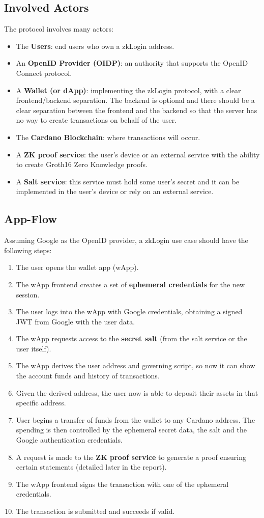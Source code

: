 \documentclass{article}
\begin{document}
\subsection{Involved Actors}
The protocol involves many actors:
\begin{itemize}
    \item The \textbf{Users}: end users who own a zkLogin address.
    \item An \textbf{OpenID Provider (OIDP)}: an authority that supports the OpenID Connect protocol.
    \item A \textbf{Wallet (or dApp)}: implementing the zkLogin protocol, with a clear frontend/backend separation. The backend is optional and there should be a clear separation between the frontend and the backend so that the server has no way to create transactions on behalf of the user.
    \item The \textbf{Cardano Blockchain}: where transactions will occur.
    \item A \textbf{ZK proof service}: the user's device or an external service with the ability to create Groth16 Zero Knowledge proofs.
    \item A \textbf{Salt service}: this service must hold some user's secret and it can be implemented in the user's device or rely on an external service.
\end{itemize}

\subsection{App-Flow}
Assuming Google as the OpenID provider, a zkLogin use case should have the following steps:
\begin{enumerate}
    \item The user opens the wallet app (wApp).
    \item The wApp frontend creates a set of \textbf{ephemeral credentials} for the new session.
    \item The user logs into the wApp with Google credentials, obtaining a signed JWT from Google with the user data.
    \item The wApp requests access to the \textbf{secret salt} (from the salt service or the user itself).
    \item The wApp derives the user address and governing script, so now it can show the account funds and history of transactions.
    \item Given the derived address, the user now is able to deposit their assets in that specific address.
    \item User begins a transfer of funds from the wallet to any Cardano address. The spending is then controlled by the ephemeral secret data, the salt and the Google authentication credentials.
    \item A request is made to the \textbf{ZK proof service} to generate a proof ensuring certain statements (detailed later in the report).
    \item The wApp frontend signs the transaction with one of the ephemeral credentials.
    \item The transaction is submitted and succeeds if valid.
\end{enumerate}
\end{document}
